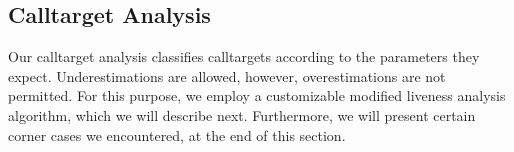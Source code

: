 %
%
%




\subsection{Calltarget Analysis}
\label{section:calltargetanalysis}
Our calltarget analysis classifies calltargets according to the parameters they expect. Underestimations are allowed, however, overestimations 
are not permitted. For this purpose, we employ a customizable modified liveness analysis algorithm, which we will describe next.
Furthermore, we will present certain corner cases we encountered, at the end of this section.


